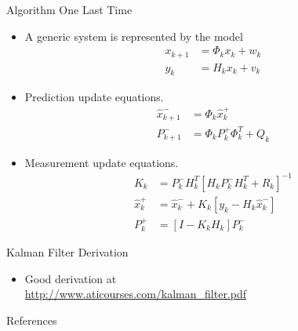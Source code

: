 \documentclass[hyperref={pdfpagelabels=false}]{beamer}
\begin{document}
\begin{frame}{Algorithm One Last Time}
\begin{itemize}
\item A generic system is represented by the model
\begin{align*}
x_{k+1} &= \Phi_kx_k + w_k \\
y_k &= H_kx_k + v_k
\end{align*}
\item Prediction update equations.
\begin{align*}
\hat{x}_{k+1}^- &= \Phi_k\hat{x}_k^+ \\
P_{k+1}^- &= \Phi_kP_k^+\Phi_k^T + Q_k
\end{align*}
\item Measurement update equations.
\begin{align*}
K_k &= P_k^-H_k^T\left[H_kP_k^-H_k^T + R_k\right]^{-1} \\
\hat{x}_k^+ &= \hat{x}_k^- + K_k\left[y_k - H_k\hat{x}_k^-\right] \\
P_k^+ &= \left[I - K_kH_k\right]P_k^-
\end{align*}
\end{itemize}
\end{frame}

\begin{frame}{Kalman Filter Derivation}
\begin{itemize}
\item Good derivation at \\
\href{http://www.aticourses.com/kalman\_filter.pdf}{http://www.aticourses.com/kalman\_filter.pdf}
\end{itemize}
\end{frame}

\begin{frame}[allowframebreaks]{References}
\nocite{Sights06}
\nocite{Kelly_1994_338}
\nocite{Orderud05}
\nocite{Simon06OptimalEstimation}
\nocite{Busse03adaptiveEKF}
\nocite{Mehra72}
\nocite{Merwe04sigma-pointNavigation}
\nocite{Busse03adaptiveEKF}
\nocite{Abbeel05discriminativetraining}
\nocite{Gelb74}
\nocite{AndersonMoore79}
\nocite{KalmanOriginal60}
\nocite{KalmanBucy61}


\end{frame}

\end{document}
